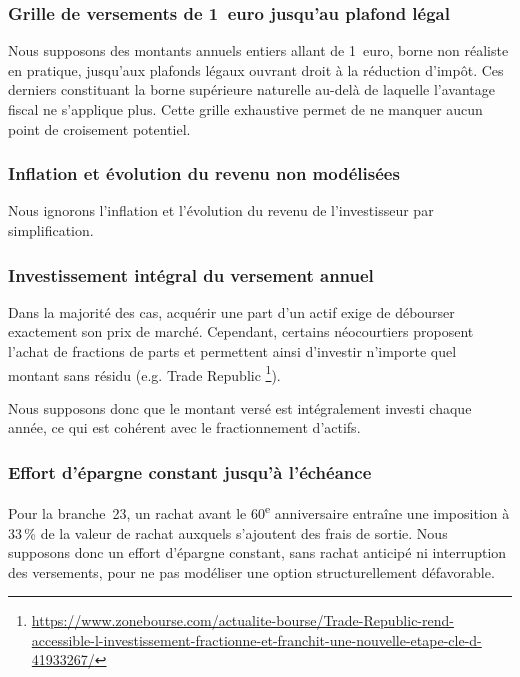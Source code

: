 ﻿\documentclass[12pt, a4paper]{article}
\begin{document}
\subsubsection*{Grille de versements de 1~euro jusqu'au plafond légal}

Nous supposons des montants annuels entiers allant de 1~euro, borne non réaliste en
pratique, jusqu'aux plafonds légaux ouvrant droit à la réduction d'impôt. Ces derniers
constituant la borne supérieure naturelle au-delà de laquelle l'avantage fiscal ne
s'applique plus. Cette grille exhaustive permet de ne manquer aucun point de
croisement potentiel.

\subsubsection*{Inflation et évolution du revenu non modélisées}

Nous ignorons l'inflation et l'évolution du revenu de l'investisseur par simplification.

\subsubsection*{Investissement intégral du versement annuel}

Dans la majorité des cas,
acquérir une part d'un actif exige de débourser exactement son prix de marché.
Cependant, certains néocourtiers 
proposent l'achat de fractions de parts et permettent ainsi d'investir n'importe
quel montant sans résidu (e.g. Trade Republic 
\footnote{\url{https://www.zonebourse.com/actualite-bourse/Trade-Republic-rend-accessible-l-investissement-fractionne-et-franchit-une-nouvelle-etape-cle-d-41933267/}}).

Nous supposons donc que le montant versé est intégralement investi chaque année, ce qui est
cohérent avec le fractionnement d'actifs.

\subsubsection*{Effort d'épargne constant jusqu'à l'échéance}

Pour la
branche~23, un rachat avant le 60\textsuperscript{e} anniversaire entraîne une imposition
à 33\,\% de la valeur de rachat auxquels s'ajoutent des frais de sortie.
Nous supposons donc un effort d'épargne constant, sans rachat anticipé ni interruption des
versements, pour ne pas modéliser une option structurellement défavorable.
\end{document}
